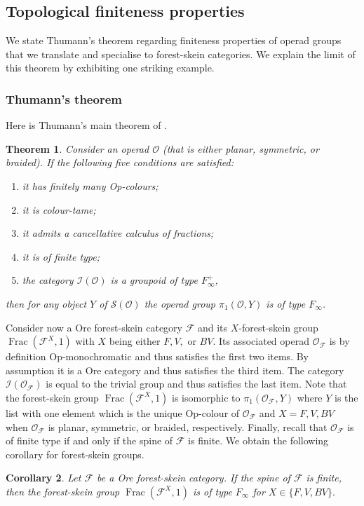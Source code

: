 \documentclass[a4paper, 12pt]{amsart}
\numberwithin{equation}{section}
\newtheorem{theorem}{Theorem}[section]
\newtheorem{corollary}[theorem]{Corollary}
\theoremstyle{definition}
\newcommand{\cF}{\mathcal F}
\DeclareMathOperator{\Frac}{Frac}
\newcommand{\cI}{\mathcal I}
\newcommand{\cO}{\mathcal O}
\newcommand{\cS}{\mathcal{S}}
\begin{document}
\subsection{Topological finiteness properties}

We state Thumann's theorem regarding finiteness properties of operad groups that we translate and specialise to forest-skein categories.
We explain the limit of this theorem by exhibiting one striking example.

\subsubsection{Thumann's theorem}
Here is Thumann's main theorem of \cite{Thumann17}.

\begin{theorem}\label{theo:Thumann}
Consider an operad $\cO$ (that is either planar, symmetric, or braided).
If the following five conditions are satisfied:
\begin{enumerate}
\item it has finitely many Op-colours;
\item it is colour-tame;
\item it admits a cancellative calculus of fractions;
\item it is of finite type;
\item the category $\cI(\cO)$ is a groupoid of type $F_\infty^+$,
\end{enumerate}
then for any object $Y$ of $\cS(\cO)$ the operad group $\pi_1(\cO,Y)$ is of type $F_\infty$.
\end{theorem}

Consider now a Ore forest-skein category $\cF$ and its $X$-forest-skein group $\Frac(\cF^X,1)$ with $X$ being either $F,V,$ or $BV$.
Its associated operad $\cO_\cF$ is by definition Op-monochromatic and thus satisfies the first two items.
By assumption it is a Ore category and thus satisfies the third item.
The category $\cI(\cO_\cF)$ is equal to the trivial group and thus satisfies the last item.
Note that the forest-skein group $\Frac(\cF^X,1)$ is isomorphic to $\pi_1(\cO_\cF, Y)$ where $Y$ is the list with one element which is the unique Op-colour of $\cO_\cF$ and $X=F,V,BV$ when $\cO_\cF$ is planar, symmetric, or braided, respectively.
Finally, recall that $\cO_\cF$ is of finite type if and only if the spine of $\cF$ is finite. 
We obtain the following corollary for forest-skein groups.

\begin{corollary}\label{theo:Finfty-withoutT}
Let $\cF$ be a Ore forest-skein category.
If the spine of $\cF$ is finite, then the forest-skein group $\Frac(\cF^X,1)$ is of type $F_\infty$ for $X\in\{F,V,BV\}.$
\end{corollary}
\end{document}

